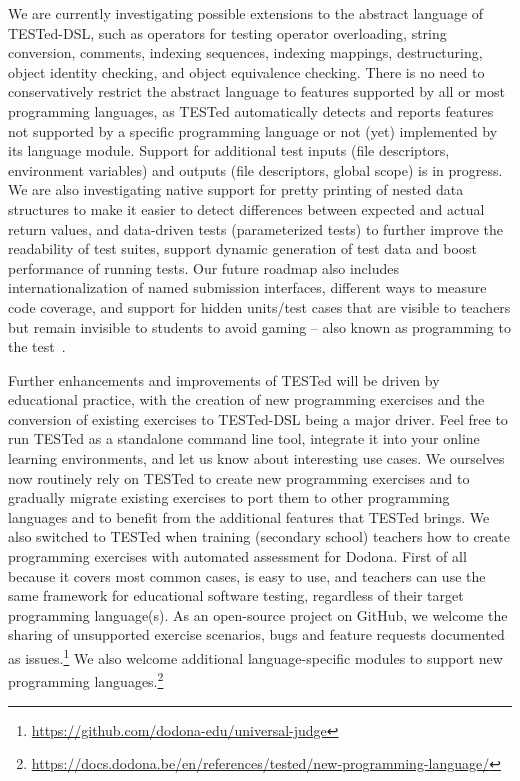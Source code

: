 \documentclass[../main]{subfiles}
\begin{document}
We are currently investigating possible extensions to the abstract language of TESTed-DSL, such as operators for testing operator overloading, string conversion, comments, indexing sequences, indexing mappings, destructuring, object identity checking, and object equivalence checking.
There is no need to conservatively restrict the abstract language to features supported by all or most programming languages, as TESTed automatically detects and reports features not supported by a specific programming language or not (yet) implemented by its language module.
Support for additional test inputs (file descriptors, environment variables) and outputs (file descriptors, global scope) is in progress.
We are also investigating native support for pretty printing of nested data structures to make it easier to detect differences between expected and actual return values, and data-driven tests (parameterized tests) to further improve the readability of test suites, support dynamic generation of test data and boost performance of running tests.
Our future roadmap also includes internationalization of named submission interfaces, different ways to measure code coverage, and support for hidden units/test cases that are visible to teachers but remain invisible to students to avoid gaming -- also known as programming to the test~\autocite{pevelerComparingJailedSandboxes2019}.

Further enhancements and improvements of TESTed will be driven by educational practice, with the creation of new programming exercises and the conversion of existing exercises to TESTed-DSL being a major driver.
Feel free to run TESTed as a standalone command line tool, integrate it into your online learning environments, and let us know about interesting use cases.
We ourselves now routinely rely on TESTed to create new programming exercises and to gradually migrate existing exercises to port them to other programming languages and to benefit from the additional features that TESTed brings.
We also switched to TESTed when training (secondary school) teachers how to create programming exercises with automated assessment for Dodona.
First of all because it covers most common cases, is easy to use, and teachers can use the same framework for educational software testing, regardless of their target programming language(s).
As an open-source project on GitHub, we welcome the sharing of unsupported exercise scenarios, bugs and feature requests documented as issues.\footnote{\url{https://github.com/dodona-edu/universal-judge}}
We also welcome additional language-specific modules to support new programming languages.\footnote{\url{https://docs.dodona.be/en/references/tested/new-programming-language/}}
\end{document}
